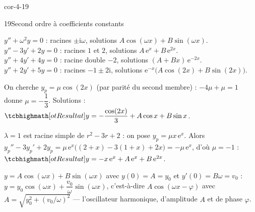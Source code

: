 \begin{blocLivre}{cor-4-19}
\begin{corrige}{19}{Second ordre à coefficients constants}
\begin{questions}
  \item $y''+\omega^{2}y=0$ : racines $\pm\mathrm{i}\omega$, solutions
    $A\cos(\omega x)+B\sin(\omega x)$.\\
    $y''-3y'+2y=0$ : racines $1$ et $2$, solutions $A\,\mathrm{e}^{x}+B\,\mathrm{e}^{2x}$.\\
    $y''+4y'+4y=0$ : racine double $-2$, solutions $(A+Bx)\,\mathrm{e}^{-2x}$.\\
    $y''+2y'+5y=0$ : racines $-1\pm2\mathrm{i}$, solutions
    $\mathrm{e}^{-x}\bigl(A\cos(2x)+B\sin(2x)\bigr)$.
  \item On cherche $y_p=\mu\cos(2x)$ (par parité du second membre) :
    $-4\mu+\mu=1$ donne $\mu=-\dfrac13$. Solutions :
    $\res{y=-\dfrac{\cos(2x)}{3}+A\cos x+B\sin x}$.
  \item $\lambda=1$ est racine simple de $r^{2}-3r+2$ : on pose
    $y_p=\mu x\,\mathrm{e}^{x}$. Alors
    $y_p''-3y_p'+2y_p=\mu\,\mathrm{e}^{x}\bigl((2+x)-3(1+x)+2x\bigr)=-\mu\,\mathrm{e}^{x}$,
    d'où $\mu=-1$ : $\res{y=-x\,\mathrm{e}^{x}+A\,\mathrm{e}^{x}+B\,\mathrm{e}^{2x}}$.
  \item $y=A\cos(\omega x)+B\sin(\omega x)$ avec $y(0)=A=y_0$ et
    $y'(0)=B\omega=v_0$ :
    $y=y_0\cos(\omega x)+\dfrac{v_0}{\omega}\sin(\omega x)$, c'est-à-dire
    $A\cos(\omega x-\varphi)$ avec $A=\sqrt{y_0^{2}+(v_0/\omega)^{2}}$ —
    l'oscillateur harmonique, d'amplitude $A$ et de phase $\varphi$.
\end{questions}
\end{corrige}
\end{blocLivre}

